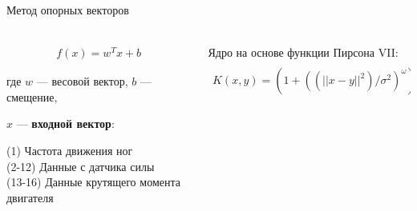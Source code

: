 \begin{frame}[t]{Метод опорных векторов}
    \framesubtitle{}
    \small

    \begin{columns}[T,onlytextwidth]
        \begin{column}{0.49\textwidth}
            \vspace{-0.5cm}
            \begin{align}
                f(x) = w^T x + b
            \end{align}

            \vspace{-0.2cm}

            где $w$ --- весовой вектор, $b$ --- смещение,

            $x$ --- \textbf{входной вектор}:

            (1) Частота движения ног\\
            (2-12) Данные с датчика силы\\
            (13-16) Данные крутящего момента двигателя\\
        \end{column}
        \begin{column}{0.49\textwidth}
            Ядро на основе функции Пирсона VII:
            \begin{align}
                K(x, y) = (1 + ((||x - y||^2)/\sigma^2)^\omega)^{(-1/\omega)}
            \end{align}

            \vspace{-0.2cm}


\end{column}
\end{columns}
\end{frame}
